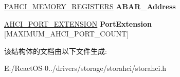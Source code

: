 \begin{DoxyCompactItemize}
\begin{tabbing}
\end{tabbing}\item 
\mbox{\label{struct___a_h_c_i___a_d_a_p_t_e_r___e_x_t_e_n_s_i_o_n_a2f30254ab0518469b8f27dde6128cf16}} 
\hyperlink{struct___a_h_c_i___m_e_m_o_r_y___r_e_g_i_s_t_e_r_s}{P\+A\+H\+C\+I\+\_\+\+M\+E\+M\+O\+R\+Y\+\_\+\+R\+E\+G\+I\+S\+T\+E\+RS} {\bfseries A\+B\+A\+R\+\_\+\+Address}
\item 
\mbox{\label{struct___a_h_c_i___a_d_a_p_t_e_r___e_x_t_e_n_s_i_o_n_a4a7bb88066c04c4a471e24f3c1aab526}} 
\hyperlink{struct___a_h_c_i___p_o_r_t___e_x_t_e_n_s_i_o_n}{A\+H\+C\+I\+\_\+\+P\+O\+R\+T\+\_\+\+E\+X\+T\+E\+N\+S\+I\+ON} {\bfseries Port\+Extension} \mbox{[}M\+A\+X\+I\+M\+U\+M\+\_\+\+A\+H\+C\+I\+\_\+\+P\+O\+R\+T\+\_\+\+C\+O\+U\+NT\mbox{]}
\end{DoxyCompactItemize}


该结构体的文档由以下文件生成\+:\begin{DoxyCompactItemize}
\item 
E\+:/\+React\+O\+S-\/0../drivers/storage/storahci/storahci.\+h\end{DoxyCompactItemize}

